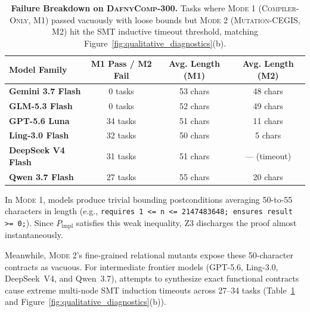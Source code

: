 \documentclass{article}
\begin{document}
\begin{table}[h]
\centering
\caption{\textbf{Failure Breakdown on \textsc{DafnyComp-300}.} Tasks where \textsc{Mode 1} (\textsc{Compiler-Only}, M1) passed vacuously with loose bounds but \textsc{Mode 2} (\textsc{Mutation-CEGIS}, M2) hit the SMT inductive timeout threshold, matching Figure~\ref{fig:qualitative_diagnostics}(b).}
\label{tab:failure_taxonomy}
\setlength{\tabcolsep}{8pt}
\begin{tabular}{lccc}
\toprule
\textbf{Model Family} & \textbf{M1 Pass / M2 Fail} & \textbf{Avg. Length (M1)} & \textbf{Avg. Length (M2)} \\
\midrule
\textbf{Gemini 3.7 Flash} & 0 tasks & 53 chars & 48 chars \\
\textbf{GLM-5.3 Flash} & 0 tasks & 52 chars & 49 chars \\
\textbf{GPT-5.6 Luna} & 34 tasks & 51 chars & 11 chars \\
\textbf{Ling-3.0 Flash} & 32 tasks & 50 chars & 5 chars \\
\textbf{DeepSeek V4 Flash} & 31 tasks & 51 chars & --- (timeout) \\
\textbf{Qwen 3.7 Flash} & 27 tasks & 55 chars & 20 chars \\
\bottomrule
\end{tabular}
\end{table}

In \textsc{Mode 1}, models produce trivial bounding postconditions averaging 50-to-55 characters in length (e.g., \texttt{requires 1 <= n <= 2147483648; ensures result >= 0;}). Since $P_{\text{impl}}$ satisfies this weak inequality, Z3 discharges the proof almost instantaneously.

Meanwhile, \textsc{Mode 2}'s fine-grained relational mutants expose these 50-character contracts as vacuous. For intermediate frontier models (GPT-5.6, Ling-3.0, DeepSeek~V4, and Qwen~3.7), attempts to synthesize exact functional contracts cause extreme multi-node SMT induction timeouts across 27--34 tasks (Table~\ref{tab:failure_taxonomy} and Figure~\ref{fig:qualitative_diagnostics}(b)).
\end{document}
